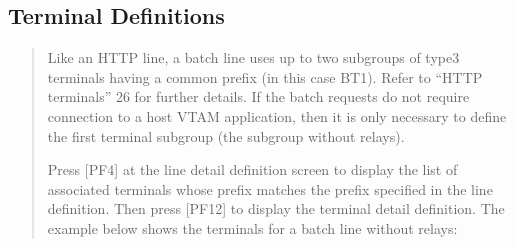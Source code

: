 \documentclass[letterpaper,10pt,english]{sphinxmanual}
\begin{document}
\ignorespaces 

\subsection{Terminal Definitions}
\label{\detokenize{connectivity_guide:index-33}}\label{\detokenize{connectivity_guide:id11}}\begin{quote}

\sphinxAtStartPar
Like an HTTP line, a batch line uses up to two sub\sphinxhyphen{}groups of type\sphinxhyphen{}3 terminals having a common prefix (in this case BT1). Refer to “HTTP terminals” 26 for further details. If the batch requests do not require connection to a host VTAM application, then it is only necessary to define the first terminal sub\sphinxhyphen{}group (the sub\sphinxhyphen{}group without relays).

\sphinxAtStartPar
Press {[}PF4{]} at the line detail definition screen to display the list of associated terminals whose prefix matches the prefix specified in the line definition. Then press {[}PF12{]} to display the terminal detail definition. The example below shows the terminals for a batch line without relays:
\end{quote}

\sphinxAtStartPar
{}

\sphinxAtStartPar
{}

\newpage

\ignorespaces 
\end{document}
